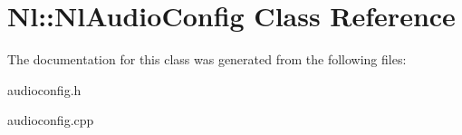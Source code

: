 \hypertarget{classNl_1_1NlAudioConfig}{}\section{Nl\+:\+:Nl\+Audio\+Config Class Reference}
\label{classNl_1_1NlAudioConfig}


The documentation for this class was generated from the following files\+:\begin{DoxyCompactItemize}
\item 
audioconfig.\+h\item 
audioconfig.\+cpp\end{DoxyCompactItemize}
